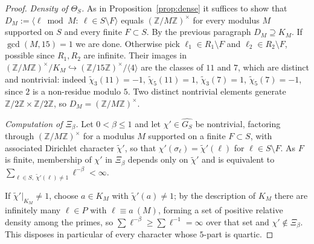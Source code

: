\documentclass[11pt]{amsart}
\numberwithin{equation}{section}
\theoremstyle{definition}
\theoremstyle{remark}
\newcommand{\Z}{\mathbb{Z}}
\begin{document}
\begin{proof}
\emph{Density of $\Theta_S$.} As in Proposition~\ref{prop:dense} it suffices to
show that $D_M:=\langle\ell\bmod M:\ \ell\in S\setminus F\rangle$ equals
$(\Z/M\Z)^\times$ for every modulus $M$ supported on $S$ and every finite
$F\subset S$. By the previous paragraph $D_M\supseteq K_M$. If $\gcd(M,15)=1$
we are done. Otherwise pick $\ell_1\in R_1\setminus F$ and $\ell_2\in R_2\setminus F$,
possible since $R_1,R_2$ are infinite. Their images in
$(\Z/M\Z)^\times/K_M\hookrightarrow(\Z/15\Z)^\times/\langle4\rangle$ are the
classes of $11$ and $7$, which are distinct and nontrivial: indeed
$\tilde\chi_3(11)=-1$, $\tilde\chi_5(11)=1$, $\tilde\chi_3(7)=1$,
$\tilde\chi_5(7)=-1$, since $2$ is a non-residue modulo $5$. Two distinct
nontrivial elements generate $\Z/2\Z\times\Z/2\Z$, so $D_M=(\Z/M\Z)^\times$.

\emph{Computation of $\Xi_\beta$.} Let $0<\beta\le1$ and let
$\chi'\in\widehat{G_S}$ be nontrivial, factoring through $(\Z/M\Z)^\times$ for
a modulus $M$ supported on a finite $F\subset S$, with associated Dirichlet
character $\tilde\chi'$, so that $\chi'(\sigma_\ell)=\tilde\chi'(\ell)$ for
$\ell\in S\setminus F$. As $F$ is finite, membership of $\chi'$ in $\Xi_\beta$
depends only on $\tilde\chi'$ and is equivalent to
$\sum_{\ell\in S,\ \tilde\chi'(\ell)\neq1}\ell^{-\beta}<\infty$.

If $\tilde\chi'|_{K_M}\neq1$, choose $a\in K_M$ with $\tilde\chi'(a)\neq1$; by
the description of $K_M$ there are infinitely many $\ell\in P$ with
$\ell\equiv a\ (M)$, forming a set of positive relative density among the
primes, so $\sum\ell^{-\beta}\ge\sum\ell^{-1}=\infty$ over that set and
$\chi'\notin\Xi_\beta$. This disposes in particular of every character whose
$5$-part is quartic.


\end{proof}
\end{document}

